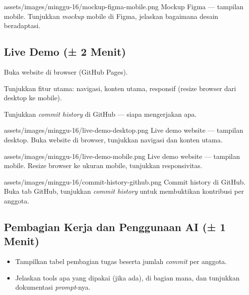 \begin{tangkapanlayar}
  {assets/images/minggu-16/mockup-figma-mobile.png}
  {Mockup Figma --- tampilan mobile.}
  {Tunjukkan \emph{mockup} mobile di Figma, jelaskan bagaimana desain beradaptasi.}
\end{tangkapanlayar}

\subsection{Live Demo (± 2 Menit)}
\label{subsec:live-demo}

\begin{langkah}
  \item Buka website di browser (GitHub Pages).
  \item Tunjukkan fitur utama: navigasi, konten utama, responsif (resize browser dari desktop ke mobile).
  \item Tunjukkan \emph{commit history} di GitHub --- siapa mengerjakan apa.
\end{langkah}

\begin{tangkapanlayar}
  {assets/images/minggu-16/live-demo-desktop.png}
  {Live demo website --- tampilan desktop.}
  {Buka website di browser, tunjukkan navigasi dan konten utama.}
\end{tangkapanlayar}

\begin{tangkapanlayar}
  {assets/images/minggu-16/live-demo-mobile.png}
  {Live demo website --- tampilan mobile.}
  {Resize browser ke ukuran mobile, tunjukkan responsivitas.}
\end{tangkapanlayar}

\begin{tangkapanlayar}
  {assets/images/minggu-16/commit-history-github.png}
  {Commit history di GitHub.}
  {Buka tab GitHub, tunjukkan \emph{commit history} untuk membuktikan kontribusi per anggota.}
\end{tangkapanlayar}

\subsection{Pembagian Kerja dan Penggunaan AI (± 1 Menit)}
\label{subsec:pembagian-kerja-presentasi}

\begin{itemize}
  \item Tampilkan tabel pembagian tugas beserta jumlah \emph{commit} per anggota.
  \item Jelaskan tools apa yang dipakai (jika ada), di bagian mana, dan tunjukkan dokumentasi \emph{prompt}-nya.
\end{itemize}

